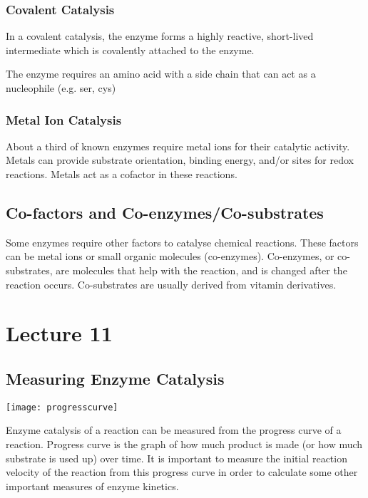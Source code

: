 \documentclass[a4paper, 12pt]{report}
\newcommand{\mychapter}[2]{
    \setcounter{chapter}{#1}
    \setcounter{section}{0}
    \chapter*{#2}
    \addcontentsline{toc}{chapter}{#2}
}
\begin{document}
\subsection{Covalent Catalysis}

In a covalent catalysis, the enzyme forms a highly reactive, short-lived intermediate which is covalently attached to the enzyme.

\begin{center}
\end{center}

The enzyme requires an amino acid with a side chain that can act as a nucleophile (e.g. ser, cys)

\subsection{Metal Ion Catalysis}

About a third of known enzymes require metal ions for their catalytic activity.
Metals can provide substrate orientation, binding energy, and/or sites for redox reactions.
Metals act as a cofactor in these reactions.

\section{Co-factors and Co-enzymes/Co-substrates}

Some enzymes require other factors to catalyse chemical reactions.
These factors can be metal ions or small organic molecules (co-enzymes).
Co-enzymes, or co-substrates, are molecules that help with the reaction, and is changed after the reaction occurs.
Co-substrates are usually derived from vitamin derivatives.

\mychapter{11}{Lecture 11}

\section{Measuring Enzyme Catalysis}

\begin{center}
\texttt{[image: progresscurve]}
\end{center}

Enzyme catalysis of a reaction can be measured from the progress curve of a reaction.
Progress curve is the graph of how much product is made (or how much substrate is used up) over time.
It is important to measure the initial reaction velocity of the reaction from this progress curve in order to calculate some other important measures of enzyme kinetics.
\end{document}
